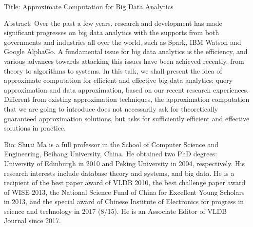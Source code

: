Title: Approximate Computation for Big Data Analytics

Abstract: Over the past a few years, research and development has made significant progresses on big data analytics with the supports from both governments and industries all over the world, such as Spark, IBM Watson and Google AlphaGo. A fundamental issue for big data analytics is the efficiency, and various advances towards attacking this issues have been achieved recently, from theory to algorithms to systems. In this talk, we shall present the idea of approximate computation for efficient and effective big data analytics: query approximation and data approximation, based on our recent research experiences. Different from existing approximation techniques, the approximation computation that we are going to introduce does not necessarily ask for theoretically guaranteed approximation solutions, but asks for sufficiently efficient and effective solutions in practice.


Bio: Shuai Ma is a full professor in the School of Computer Science and Engineering, Beihang University, China. He obtained two PhD degrees: University of Edinburgh in 2010 and Peking University in 2004, respectively. His research interests include database theory and systems, and big data. He is a recipient of the best paper award of VLDB 2010, the best challenge paper award of WISE 2013, the National Science Fund of China for Excellent Young Scholars in 2013, and  the special award of Chinese Institute of Electronics for progress in science and technology in 2017 (8/15). He is an Associate Editor of VLDB Journal since 2017.
